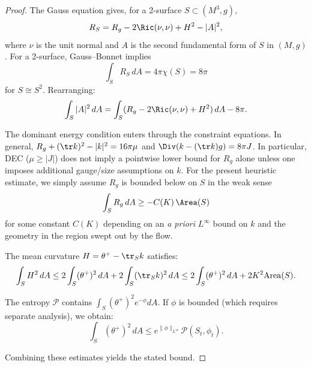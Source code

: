 \begin{proof}
The Gauss equation gives, for a 2-surface $S\subset (M^3,g)$,
\begin{equation}
R_S = R_g - 2\Ric(\nu,\nu) + H^2 - |A|^2,
\end{equation}
where $\nu$ is the unit normal and $A$ is the second fundamental form of $S$ in $(M,g)$.
For a 2-surface, Gauss--Bonnet implies
\begin{equation}
\int_S R_S \, dA = 4\pi \chi(S) = 8\pi
\end{equation}
for $S \cong S^2$. Rearranging:
\begin{equation}
\int_S |A|^2 \, dA = \int_S (R_g - 2\Ric(\nu,\nu) + H^2) \, dA - 8\pi.
\end{equation}

The dominant energy condition enters through the constraint equations. In general,
$R_g + (\tr k)^2 - |k|^2 = 16\pi\mu$ and $\Div(k-(\tr k)g)=8\pi J$.
In particular, DEC ($\mu\ge |J|$) does not imply a pointwise lower bound for $R_g$ alone unless one imposes additional gauge/size assumptions on $k$.
For the present heuristic estimate, we simply assume $R_g$ is bounded below on $S$ in the weak sense
\begin{equation}
\int_S R_g\,dA \ge -C(K)\,\Area(S)
\end{equation}
for some constant $C(K)$ depending on an \emph{a priori} $L^\infty$ bound on $k$ and the geometry in the region swept out by the flow.

The mean curvature $H = \theta^+ - \tr_S k$ satisfies:
\begin{equation}
\int_S H^2 \, dA \leq 2\int_S (\theta^+)^2 \, dA + 2\int_S (\tr_S k)^2 \, dA \leq 2\int_S (\theta^+)^2 \, dA + 2K^2 \mathrm{Area}(S).
\end{equation}

The entropy $\mathcal{P}$ contains $\int_S (\theta^+)^2 e^{-\phi} dA$. If $\phi$ is bounded (which requires separate analysis), we obtain:
\begin{equation}
\int_S (\theta^+)^2 \, dA \leq e^{\|\phi\|_{L^\infty}} \mathcal{P}(S_t, \phi_t).
\end{equation}

Combining these estimates yields the stated bound.
\end{proof}

